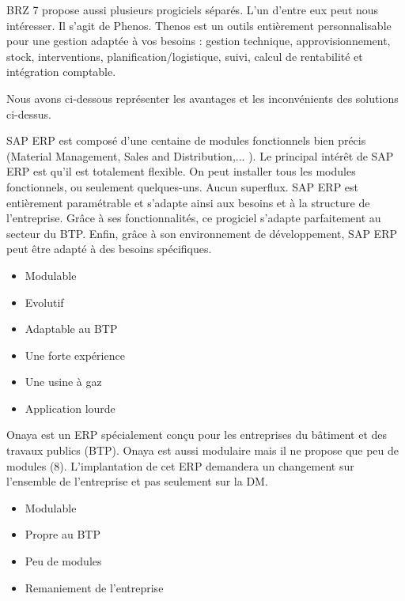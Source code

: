 		BRZ 7 propose aussi plusieurs progiciels séparés. L'un d'entre eux peut nous intéresser. Il s'agit de Phenos.
    Thenos est un outils entièrement personnalisable pour une gestion adaptée à vos besoins : 
    gestion technique, approvisionnement, stock, interventions, planification/logistique, suivi, calcul de rentabilité et intégration comptable. 
		  
		


Nous avons ci-dessous représenter les avantages et les inconvénients des solutions ci-dessus.


{
SAP ERP est composé d'une centaine de modules fonctionnels bien précis (Material Management, Sales and Distribution,... ).
Le principal intérêt de SAP ERP est qu'il est totalement flexible. On peut installer tous les modules fonctionnels, ou seulement quelques-uns.
Aucun superflux. SAP ERP est entièrement paramétrable et s'adapte ainsi aux besoins et à la structure de l'entreprise.
Grâce à ses fonctionnalités, ce progiciel s'adapte parfaitement au secteur du BTP.
Enfin, grâce à son environnement de développement, SAP ERP peut être adapté à des besoins spécifiques.
}
{
    \begin{itemize}
        \item Modulable
        \item Evolutif
        \item Adaptable au BTP
        \item Une forte expérience
    \end{itemize}
}
{
    \begin{itemize}
        \item Une usine à gaz
        \item Application lourde
    \end{itemize}
}

 
 
{
Onaya est un ERP spécialement conçu pour les entreprises du bâtiment et des travaux publics (BTP).
Onaya est aussi modulaire mais il ne propose que peu de modules (8).
L'implantation de cet ERP demandera un changement sur l'ensemble de l'entreprise et pas seulement sur la DM.
}
{
    \begin{itemize}
        \item Modulable
        \item Propre au BTP
    \end{itemize}
}
{
    \begin{itemize}
        \item Peu de modules
        \item Remaniement de l'entreprise
    \end{itemize}
}

